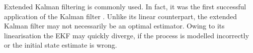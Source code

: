 Extended Kalman filtering is commonly used. In fact, it was the first successful application of the Kalman filter \cite{grewal2008kalman}. Unlike its linear counterpart, the extended Kalman filter may not necessarily be an optimal estimator. Owing to its linearisation the EKF may quickly diverge, if the process is modelled incorrectly or the initial state estimate is wrong.


